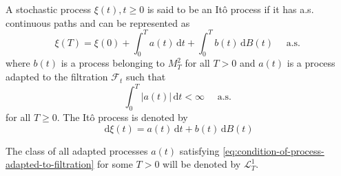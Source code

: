 \begin{definition}
	A stochastic process $\xi(t),t\geq 0$ is said to be an Itô process if it has a.s. continuous paths and can be represented as
	\begin{equation}
		\xi(T)=\xi(0)+\int_{0}^{T}a(t)\,\mathrm{d}t+\int_{0}^{T}b(t)\,\mathrm{d}B(t)\quad\text { a.s. }
	\end{equation}
	where $b(t)$ is a process belonging to $M_{T}^{2}$ for all $T>0$ and $a(t)$ is a process adapted to the filtration $\mathcal{F}_{t}$ such that
	\begin{equation}
		\int_{0}^{T}|a(t)|\,\mathrm{d}t<\infty\quad\text { a.s. } \label{eq:condition-of-process-adapted-to-filtration}
	\end{equation}
	for all $T\geq 0$.
	The Itô process is denoted by
	\begin{equation}
		\mathrm{d}\xi(t)=a(t)\,\mathrm{d}t+b(t)\,\mathrm{d}B(t)
	\end{equation}
\end{definition}

\begin{remark}
	The class of all adapted processes $a(t)$ satisfying \ref{eq:condition-of-process-adapted-to-filtration} for some $T>0$ will be denoted by $\mathcal{L}_{T}^{1}$.
\end{remark}

